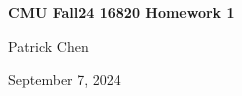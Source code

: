 \documentclass{article}
\begin{document}
	\begin{titlepage}
    	\vspace*{\fill} %
    	\begin{center}
        	{\huge \textbf{CMU Fall24 16820 Homework 1} \par}
       		\vspace{0.5cm}
        		{\large Patrick Chen \par}
        		\vspace{0.5cm}
        		{\large September 7, 2024 \par}
    	\end{center}
    	\vspace*{\fill} %
	\end{titlepage}
	
	\newpage
\end{document}
